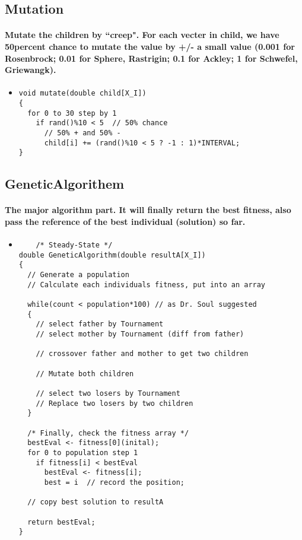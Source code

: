 \documentclass[12pt]{article}
\begin{document}
\subsection{Mutation}
\paragraph{Mutate the children by ``creep". For each vecter in child, we have 50percent chance to mutate the value by +/- a small value (0.001 for Rosenbrock; 0.01 for Sphere, Rastrigin; 0.1 for Ackley; 1 for Schwefel, Griewangk).}
\begin{itemize}
	\item 
	\begin{lstlisting}
void mutate(double child[X_I])
{
  for 0 to 30 step by 1
    if rand()%10 < 5  // 50% chance
      // 50% + and 50% -
      child[i] += (rand()%10 < 5 ? -1 : 1)*INTERVAL;
}
	\end{lstlisting}
\end{itemize}

\subsection{GeneticAlgorithem}
\paragraph{The major algorithm part. It will finally return the best fitness, also pass the reference of the best individual (solution) so far.}
\begin{itemize}
	\item
	\begin{lstlisting}
	/* Steady-State */
double GeneticAlgorithm(double resultA[X_I])
{
  // Generate a population
  // Calculate each individuals fitness, put into an array

  while(count < population*100) // as Dr. Soul suggested
  {
    // select father by Tournament
    // select mother by Tournament (diff from father)
  	
	// crossover father and mother to get two children
    
    // Mutate both children	
    
    // select two losers by Tournament
    // Replace two losers by two children
  }
  
  /* Finally, check the fitness array */
  bestEval <- fitness[0](inital);
  for 0 to population step 1
    if fitness[i] < bestEval
      bestEval <- fitness[i];
      best = i	// record the position;
      
  // copy best solution to resultA      
      
  return bestEval;
}
	\end{lstlisting}
\end{itemize}
\end{document}
